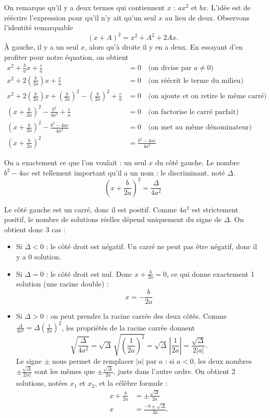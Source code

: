 \documentclass[12pt,a4paper]{article}
\theoremstyle{plain}
\theoremstyle{definition}
\theoremstyle{remark}
\begin{document}
On remarque qu'il y a deux termes qui contiennent $x$ : $ax^2$ et $bx$.
L'idée est de réécrire l'expression pour qu'il n'y ait qu'un seul $x$ au lieu de
deux. Observons l'identité remarquable
\[
(x + A)^2 = x^2 + A^2 + 2Ax.
\]
À gauche, il y a un seul $x$, alors qu'à droite il y en a deux. En essayant
d'en profiter pour notre équation, on obtient
\[
\begin{aligned}
  x^2 + \frac{b}{a}x + \frac{c}{a} &= 0 \quad \text{(on divise par } a \neq 0 \text{)} \\
  x^2 + 2\left(\frac{b}{2a}\right)x + \frac{c}{a} &= 0 \quad \text{(on réécrit le terme du milieu)} \\
  x^2 + 2\left(\frac{b}{2a}\right)x + \left(\frac{b}{2a}\right)^2 - \left(\frac{b}{2a}\right)^2 + \frac{c}{a} &= 0 \quad \text{(on ajoute et on retire le même carré)} \\
  \left(x + \frac{b}{2a}\right)^2 - \frac{b^2}{4a^2} + \frac{c}{a} &= 0 \quad \text{(on factorise le carré parfait)} \\
  \left(x + \frac{b}{2a}\right)^2 - \frac{b^2 - 4ac}{4a^2} &= 0 \quad \text{(on met au même dénominateur)} \\
  \left(x + \frac{b}{2a}\right)^2 &= \frac{b^2 - 4ac}{4a^2}
\end{aligned}
\]

On a exactement ce que l'on voulait : un seul $x$ du côté gauche. Le nombre
$b^2 - 4ac$ est tellement important qu'il a un nom : le discriminant, noté $\Delta$.
\[
\left(x + \frac{b}{2a}\right)^2 = \frac{\Delta}{4a^2}
\]

Le côté gauche est un carré, donc il est positif. Comme $4a^2$ est strictement
positif, le nombre de solutions réelles dépend uniquement du signe de $\Delta$.
On obtient donc 3 cas :

\begin{itemize}
  \item Si $\Delta < 0$ : le côté droit est négatif. Un carré ne peut pas être
  négatif, donc il y a 0 solution.
  \item Si $\Delta = 0$ : le côté droit est nul. Donc $x + \frac{b}{2a} = 0$, ce qui
  donne exactement 1 solution (une racine double) :
  \[
  x = -\frac{b}{2a}
  \]
  \item Si $\Delta > 0$ : on peut prendre la racine carrée des deux côtés. Comme
  $\frac{\Delta}{4a^2} = \Delta \left(\frac{1}{2a}\right)^2$, les propriétés de
  la racine carrée donnent
  \[
  \sqrt{\frac{\Delta}{4a^2}} = \sqrt{\Delta}\,\sqrt{\left(\frac{1}{2a}\right)^2}
  = \sqrt{\Delta}\,\left\lvert\frac{1}{2a}\right\rvert = \frac{\sqrt{\Delta}}{2\lvert a \rvert}.
  \]
  Le signe $\pm$ nous permet de remplacer $\lvert a \rvert$ par $a$ : si $a < 0$,
  les deux nombres $\pm\frac{\sqrt{\Delta}}{2\lvert a \rvert}$ sont les mêmes
  que $\pm\frac{\sqrt{\Delta}}{2a}$, juste dans l'autre ordre. On obtient 2 solutions,
  notées $x_1$ et $x_2$, et la célèbre formule :
  \[
  \begin{aligned}
    x + \frac{b}{2a} &= \pm \frac{\sqrt{\Delta}}{2a} \\
    x &= \frac{-b \pm \sqrt{\Delta}}{2a}.
  \end{aligned}
  \]
\end{itemize}
\end{document}
